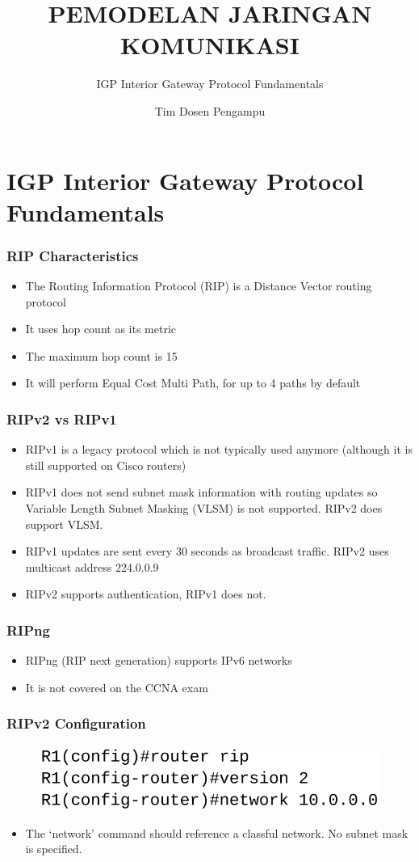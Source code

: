 \documentclass[pdflatex,compress,mathserif]{beamer}
\title{PEMODELAN JARINGAN KOMUNIKASI}
\subtitle{IGP Interior Gateway Protocol Fundamentals}
\author{Tim Dosen Pengampu}
\begin{document}
	
\maketitle

\section{IGP Interior Gateway Protocol Fundamentals}

\begin{frame}
	\frametitle{RIP Characteristics}
	\begin{itemize}
		\item The Routing Information Protocol (RIP) is a Distance Vector
routing protocol
		\item It uses hop count as its metric
		\item The maximum hop count is 15
		\item It will perform Equal Cost Multi Path, for up to 4 paths by default
	\end{itemize}
\end{frame}

\begin{frame}
	\frametitle{RIPv2 vs RIPv1}
	\begin{itemize}
		\item RIPv1 is a legacy protocol which is not typically used anymore
(although it is still supported on Cisco routers)
		\item RIPv1 does not send subnet mask information with routing
updates so Variable Length Subnet Masking (VLSM) is not
supported. RIPv2 does support VLSM.
		\item RIPv1 updates are sent every 30 seconds as broadcast traffic.
RIPv2 uses multicast address 224.0.0.9
		\item RIPv2 supports authentication, RIPv1 does not.
	\end{itemize}
\end{frame}

\begin{frame}
	\frametitle{RIPng}
	\begin{itemize}
		\item RIPng (RIP next generation) supports IPv6 networks
		\item It is not covered on the CCNA exam
	\end{itemize}
\end{frame}

\begin{frame}
	\frametitle{RIPv2 Configuration}
	\begin{figure}
		\centering
		\includegraphics[width=0.7\linewidth]{img/img01}
	\end{figure}
	\begin{itemize}
		\item The ‘network’ command should reference a classful network. No subnet
		mask is specified.
	\end{itemize}
\end{frame}
\end{document}
